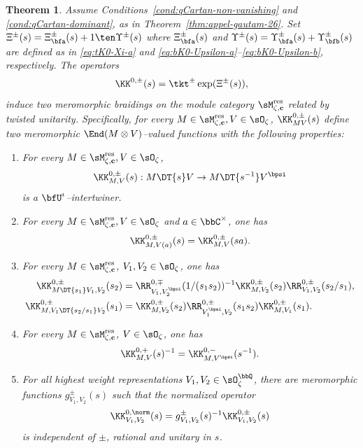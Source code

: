 \documentclass[reqno]{amsart}
\numberwithin{equation}{section}
\newtheorem*{theorem}{Theorem}
\begin{document}
\begin{theorem}\label{thm:tensor-K}
Assume Conditions~\ref{cond:qCartan-non-vanishing} and
\ref{cond:qCartan-dominant}, as in Theorem~\ref{thm:appel-gautam-26}.
Set $\Xi^\pm(s)=\Xi_{\bfa}^\pm(s)+1\ten\Upsilon^\pm(s)$ where 
$\Xi^\pm_\bfa(s)$ and $\Upsilon^\pm(s)=\Upsilon_{\bfa}^\pm(s)+\Upsilon_{\bfb}^\pm(s)$ are defined as in \eqref{eq:tK0-Xi-a} and  \eqref{eq:bK0-Upsilon-a}--\eqref{eq:bK0-Upsilon-b}, respectively. 
The operators
\begin{equation}\label{eq:tensor-K}
	\KK^{0,\pm}(s)={\tkt}^\pm\exp(\Xi^{\pm}(s)),
\end{equation}
induce two meromorphic braidings on the module category $\sM_{\zeta,\mathbf c}^{\mathrm{res}}$ related by twisted unitarity.
Specifically, for every $M\in\sM_{\zeta,\mathbf c}^{\mathrm{res}},V\in\sO_\zeta$, $\KK_{MV}^{0,\pm}(s)$
define two meromorphic $\End(M\otimes V)$--valued functions
with the following properties:
\begin{enumerate}[font=\upshape]\itemsep0.25cm
	\item\label{K0:int} For every $M\in\sM_{\zeta,\mathbf c}^{\mathrm{res}}, V\in\sO_\zeta$,
	\begin{equation}\label{eq:K0-intertwining}
	\KK^{0,\pm}_{M,V}(s) : M\DT{s} V \to
	M\DT{s^{-1}}V^{\bpsi}
	\end{equation}
	is a $\bfU^{\imath}$--intertwiner.
	\item\label{K0:shift} For every $M\in\sM_{\zeta,\mathbf c}^{\mathrm{res}},V\in\sO_\zeta$
	and $a\in\bbC^\times$, one has
	\begin{equation}\label{eq:K0-shift}
	\KK^{0,\pm}_{M,V(a)}(s) = \KK^{0,\pm}_{M,V}(sa).
	\end{equation}
	\item\label{K0:cabling} For every $M\in\sM_{\zeta,\mathbf c}^{\mathrm{res}}$, $V_1,V_2\in\sO_\zeta$, one has
	\begin{align}
		\label{eq:cabling-K-left}
		\KK^{0,\pm}_{M\DT{s_1}V_1,V_2}(s_2) &= \RR^{0,\mp}_{V_1,V_2^{\bpsi}}(1/(s_1s_2))^{-1}\KK^{0,\pm}_{M,V_2}(s_2)
		\RR^{0,\pm}_{V_1,V_2}(s_2/s_1), \\
		\label{eq:cabling-K-right}
		\KK^{0,\pm}_{M,V_1\DT{s_2/s_1}V_2}(s_1) &= \KK^{0,\pm}_{M,V_2}(s_2)
		\RR^{0,\pm}_{V_1^\bpsi,V_2}(s_1s_2)\KK^{0,\pm}_{M,V_1}(s_1).
	\end{align}
	\item\label{K0:unitary} For every $M\in\sM_{\zeta,\mathbf c}^{\mathrm{res}}$, $V\in\sO_\zeta$, one has
	\begin{equation}\label{eq:K0-unitarity}
	\KK^{0,+}_{M,V}(s)^{-1} =
	\KK^{0,-}_{M,V^{\bpsi}}(s^{-1}).
	\end{equation}
	\item\label{K0:rat} For all highest weight representations $V_1,V_2\in\sO^\bbQ_{\zeta}$, there are meromorphic functions $g^{\pm}_{V_1,V_2}(s)$ such that the normalized operator
	\begin{equation}\label{eq:K0-rational}
	\KK^{0,\norm}_{V_1,V_2}(s)=g^{\pm}_{V_1,V_2}(s)^{-1}\KK^{0,\pm}_{V_1,V_2}(s)
	\end{equation}
	is independent of $\pm$, rational and unitary in $s$.
\end{enumerate}
\end{theorem}
\end{document}
